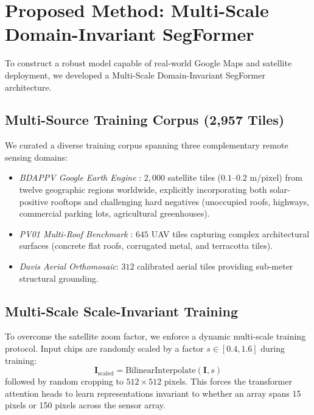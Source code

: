 \documentclass[conference]{IEEEtran}
\begin{document}
\section{Proposed Method: Multi-Scale Domain-Invariant SegFormer}
To construct a robust model capable of real-world Google Maps and satellite deployment, we developed a Multi-Scale Domain-Invariant SegFormer architecture.

\subsection{Multi-Source Training Corpus (2,957 Tiles)}
We curated a diverse training corpus spanning three complementary remote sensing domains:
\begin{itemize}
    \item \textit{BDAPPV Google Earth Engine} \cite{b_bdappv}: $2,000$ satellite tiles ($0.1\text{--}0.2\text{ m/pixel}$) from twelve geographic regions worldwide, explicitly incorporating both solar-positive rooftops and challenging hard negatives (unoccupied roofs, highways, commercial parking lots, agricultural greenhouses).
    \item \textit{PV01 Multi-Roof Benchmark} \cite{b_pv01}: $645$ UAV tiles capturing complex architectural surfaces (concrete flat roofs, corrugated metal, and terracotta tiles).
    \item \textit{Davis Aerial Orthomosaic}: $312$ calibrated aerial tiles providing sub-meter structural grounding.
\end{itemize}

\subsection{Multi-Scale Scale-Invariant Training}
To overcome the satellite zoom factor, we enforce a dynamic multi-scale training protocol. Input chips are randomly scaled by a factor $s \in [0.4, 1.6]$ during training:
\begin{equation}
\mathbf{I}_{\text{scaled}} = \text{BilinearInterpolate}(\mathbf{I}, s)
\end{equation}
followed by random cropping to $512 \times 512$ pixels. This forces the transformer attention heads to learn representations invariant to whether an array spans 15 pixels or 150 pixels across the sensor array.
\end{document}
